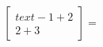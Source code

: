 \documentclass[preview]{standalone}
\begin{document}
\begin{align*}
\begin{bmatrix} text{-}1 + 2 \\ 2 + 3 \end{bmatrix} =
\end{align*}
\end{document}
